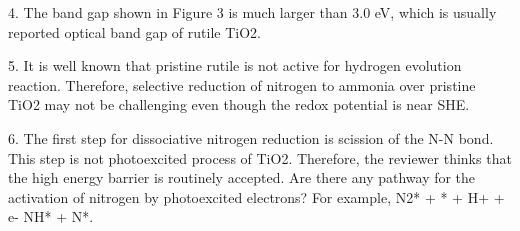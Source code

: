 4. The band gap shown in Figure 3 is much larger than 3.0 eV, which is usually reported optical band gap of rutile TiO2.


5. It is well known that pristine rutile is not active for hydrogen evolution reaction. Therefore, selective reduction of nitrogen to ammonia over pristine TiO2 may not be challenging even though the redox potential is near SHE.



6. The first step for dissociative nitrogen reduction is scission of the N-N bond. This step is not photoexcited process of TiO2. Therefore, the reviewer thinks that the high energy barrier is routinely accepted. Are there any pathway for the activation of nitrogen by photoexcited electrons? For example, N2* + * + H+ + e-  NH* + N*.



